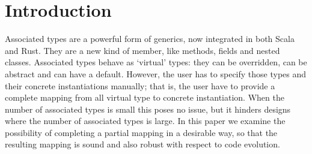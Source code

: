 \section{Introduction}

Associated types are a powerful form of generics, now integrated in both Scala and Rust.
They are a new kind of member, like methods, fields and nested classes.
Associated types behave as `virtual' types: they can be overridden, can be abstract and can have
a default.
However, the user has to specify those types and their concrete instantiations manually; that is, the user
have to provide a complete mapping from all virtual type to concrete instantiation.
When the number of associated types is small this poses no issue, but it hinders designs where the number of
associated types is large. In this paper we examine the possibility of completing
a partial mapping in a desirable way, so that the resulting mapping is sound and also robust with
respect to code evolution.

